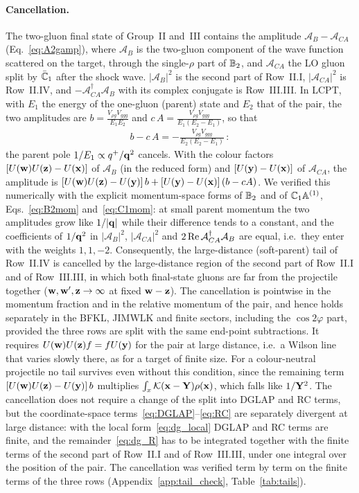 \paragraph{Cancellation.} The two-gluon final state of Group~II and~III contains the amplitude $\mathcal A_B-\mathcal A_{CA}$ (Eq.~\eqref{eq:A2gamp}), where $\mathcal A_B$ is the two-gluon component of the wave function scattered on the target, through the single-$\rho$ part of $\mathbb{B}_2$, and $\mathcal A_{CA}$ the LO gluon split by $\bar{\mathbb{C}}_1$ after the shock wave. $|\mathcal A_B|^2$ is the second part of Row~II.I, $|\mathcal A_{CA}|^2$ is Row~II.IV, and $-\mathcal A^\dagger_{CA}\mathcal A_B$ with its complex conjugate is Row~III.III. In LCPT, with $E_1$ the energy of the one-gluon (parent) state and $E_2$ that of the pair, the two amplitudes are $b=\frac{V_{\rho g}V_{ggg}}{E_1E_2}$ and $c\,A=\frac{V_{\rho g}V_{ggg}}{E_1(E_2-E_1)}$, so that
\begin{align}\label{eq:dg_bcA}
b-c\,A=-\frac{V_{\rho g}V_{ggg}}{E_2(E_2-E_1)}\,:
\end{align}
the parent pole $1/E_1\propto q^+/\mathbf{q}^2$ cancels. With the colour factors $[U(\mathbf{w})U(\mathbf{z})-U(\mathbf{x})]$ of $\mathcal A_B$ (in the reduced form) and $[U(\mathbf{y})-U(\mathbf{x})]$ of $\mathcal A_{CA}$, the amplitude is $[U(\mathbf{w})U(\mathbf{z})-U(\mathbf{y})]\,b+[U(\mathbf{y})-U(\mathbf{x})]\,(b-cA)$. We verified this numerically with the explicit momentum-space forms of $\mathbb{B}_2$ and of $\mathbb{C}_1\mathbb{A}^{(1)}$, Eqs.~\eqref{eq:B2mom} and~\eqref{eq:C1mom}: at small parent momentum the two amplitudes grow like $1/|\mathbf{q}|$ while their difference tends to a constant, and the coefficients of $1/\mathbf{q}^2$ in $|\mathcal A_B|^2$, $|\mathcal A_{CA}|^2$ and $2\,{\rm Re}\,\mathcal A_{CA}^\dagger\mathcal A_B$ are equal, i.e.\ they enter with the weights $1,1,-2$. Consequently, the large-distance (soft-parent) tail of Row~II.IV is cancelled by the large-distance region of the second part of Row~II.I and of Row~III.III, in which both final-state gluons are far from the projectile together ($\mathbf{w},\mathbf{w}',\mathbf{z}\to\infty$ at fixed $\mathbf{w}-\mathbf{z}$). The cancellation is pointwise in the momentum fraction and in the relative momentum of the pair, and hence holds separately in the BFKL, JIMWLK and finite sectors, including the $\cos2\varphi$ part, provided the three rows are split with the same end-point subtractions. It requires $U(\mathbf{w})U(\mathbf{z})f=fU(\mathbf{y})$ for the pair at large distance, i.e.\ a Wilson line that varies slowly there, as for a target of finite size. For a colour-neutral projectile no tail survives even without this condition, since the remaining term $[U(\mathbf{w})U(\mathbf{z})-U(\mathbf{y})]\,b$ multiplies $\int_x\mathcal{K}(\mathbf{x}-\mathbf{Y})\rho(\mathbf{x})$, which falls like $1/\mathbf{Y}^2$. The cancellation does not require a change of the split into DGLAP and RC terms, but the coordinate-space terms~\eqref{eq:DGLAP}--\eqref{eq:RC} are separately divergent at large distance: with the local form~\eqref{eq:dg_local} DGLAP and RC terms are finite, and the remainder~\eqref{eq:dg_R} has to be integrated together with the finite terms of the second part of Row~II.I and of Row~III.III, under one integral over the position of the pair. 
The cancellation was verified term by term on the finite terms of the three rows (Appendix~\ref{app:tail_check}, Table~\ref{tab:tails}).
